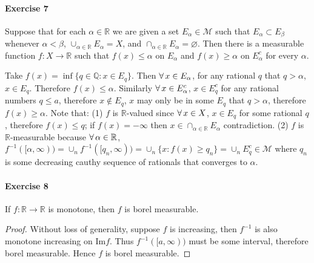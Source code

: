 \paragraph{Exercise 7}
Suppose that for each $\alpha\in\mathbb{R}$ we are given a set $E_\alpha\in\mathcal{M}$ such that $E_\alpha\subset E_\beta$ whenever $\alpha<\beta$, $\cup_{\alpha\in\mathbb{R}}E_\alpha=X$, and $\cap_{\alpha\in\mathbb{R}}E_\alpha=\varnothing$. Then there is a measurable function $f:X\to\mathbb{R}$ such that $f(x)\le\alpha$ on $E_\alpha$ and $f(x)\ge\alpha$ on $E^c_\alpha$ for every $\alpha$.
\begin{solution}
    Take $f(x)=\inf\{q\in\mathbb{Q}:x\in E_q\}$. Then $\forall\, x\in E_\alpha$, for any rational $q$ that $q>\alpha$, $x\in E_q$. Therefore $f(x)\le\alpha$. Similarly $\forall\, x\in E_\alpha^c$, $x\in E_q^c$ for any rational numbers $q\le a$, therefore $x\not\in E_q$, $x$ may only be in some $E_q$ that $q>\alpha$, therefore $f(x)\ge\alpha$. Note that: (1) $f$ is $\mathbb{R}$-valued since $\forall\, x\in X$, $x\in E_q$ for some rational $q$, therefore $f(x)\le q$; if $f(x)=-\infty$ then $x\in\cap_{\alpha\in\mathbb{R}}E_\alpha$ contradiction. (2) $f$ is $\mathbb{R}$-measurable because $\forall\, \alpha\in\mathbb{R}$, $f^{-1}([\alpha,\infty))=\cup_n f^{-1}([q_n,\infty))=\cup_n\{x:f(x)\ge q_n\}=\cup_n E_q^c\in\mathcal{M}$ where $q_n$ is some decreasing cauthy sequence of rationals that converges to $\alpha$.
\end{solution}
\paragraph{Exercise 8}
If $f:\mathbb{R}\to\mathbb{R}$ is monotone, then $f$ is borel measurable.
\begin{proof}
    Without loss of generality, suppose $f$ is increasing, then $f^{-1}$ is also monotone increasing on $\mathrm{Im}f$. Thus $f^{-1}([a,\infty))$ must be some interval, therefore borel measurable. Hence $f$ is borel measurable.
\end{proof}
